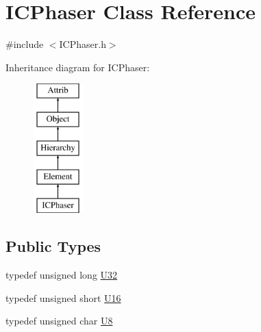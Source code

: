 \hypertarget{classICPhaser}{}\section{I\+C\+Phaser Class Reference}
\label{classICPhaser}


{\ttfamily \#include $<$I\+C\+Phaser.\+h$>$}

Inheritance diagram for I\+C\+Phaser\+:\begin{figure}[H]
\begin{center}
\leavevmode
\includegraphics[height=5.000000cm]{classICPhaser}
\end{center}
\end{figure}
\subsection*{Public Types}
\begin{DoxyCompactItemize}
\item 
typedef unsigned long \hyperlink{classICPhaser_ae7a88b0c8e5ce2b7406c0e6bcd6f2a24}{U32}
\item 
typedef unsigned short \hyperlink{classICPhaser_a66a90f8d7b28e695c98dbca784a57c8b}{U16}
\item 
typedef unsigned char \hyperlink{classICPhaser_a4f9b2302efbd7bdd70d7d80b415f1a9d}{U8}
\end{DoxyCompactItemize}
